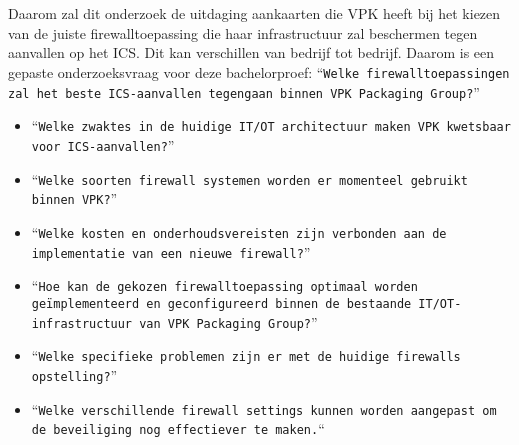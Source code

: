 \section{}%
\label{sec:onderzoeksvraag}

Daarom zal dit onderzoek de uitdaging aankaarten die VPK heeft bij het kiezen van de juiste firewalltoepassing die haar infrastructuur zal beschermen tegen aanvallen op het ICS. Dit kan verschillen van bedrijf tot bedrijf. Daarom is een gepaste onderzoeksvraag voor deze bachelorproef: ``\texttt{Welke firewalltoepassingen zal het beste ICS-aanvallen tegengaan binnen VPK Packaging Group?}''

\begin{itemize}
    \item ``\texttt{Welke zwaktes in de huidige IT/OT architectuur maken VPK kwetsbaar voor ICS-aanvallen?}''
    \item ``\texttt{Welke soorten firewall systemen worden er momenteel gebruikt binnen VPK?}''
    \item ``\texttt{Welke kosten en onderhoudsvereisten zijn verbonden aan de implementatie van een nieuwe firewall?}''
    \item ``\texttt{Hoe kan de gekozen firewalltoepassing optimaal worden geïmplementeerd en geconfigureerd binnen de bestaande IT/OT-infrastructuur van VPK Packaging Group?}''
    \item ``\texttt{Welke specifieke problemen zijn er met de huidige firewalls opstelling?}''
    \item ``\texttt{Welke verschillende firewall settings kunnen worden aangepast om de beveiliging nog effectiever te maken.}``
    \end{itemize}

\section{}%
\label{sec:onderzoeksdoelstelling}

